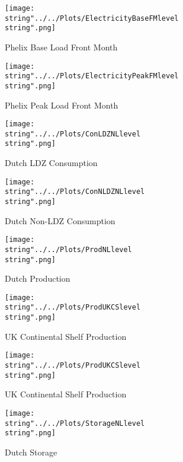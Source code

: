 \begin{figure}[ht]
  \centering
\texttt{[image: \\string"../../Plots/ElectricityBaseFMlevel\\string".png]}
  \caption{Phelix Base Load Front Month}\label{fig:ElectricityBaseFMlevel}
\end{figure}

\begin{figure}[ht]
  \centering
\texttt{[image: \\string"../../Plots/ElectricityPeakFMlevel\\string".png]}
  \caption{Phelix Peak Load Front Month}\label{fig:ElectricityPeakFMlevel}
\end{figure}

\begin{figure}[ht]
  \centering
\texttt{[image: \\string"../../Plots/ConLDZNLlevel\\string".png]}
  \caption{Dutch LDZ Consumption}\label{fig:ConLDZNLlevel}
\end{figure}

\begin{figure}[ht]
  \centering
\texttt{[image: \\string"../../Plots/ConNLDZNLlevel\\string".png]}
  \caption{Dutch Non-LDZ Consumption}\label{fig:ConNLDZNLlevel}
\end{figure}

\begin{figure}[ht]
  \centering
\texttt{[image: \\string"../../Plots/ProdNLlevel\\string".png]}
  \caption{Dutch Production}\label{fig:ProdNLlevel}
\end{figure}


\begin{figure}[ht]
  \centering
\texttt{[image: \\string"../../Plots/ProdUKCSlevel\\string".png]}
  \caption{UK Continental Shelf Production}\label{fig:ProdUKCSlevel}
\end{figure}


\begin{figure}[ht]
  \centering
\texttt{[image: \\string"../../Plots/ProdUKCSlevel\\string".png]}
  \caption{UK Continental Shelf Production}\label{fig:ProdUKCSlevel}
\end{figure}

\begin{figure}[ht]
  \centering
\texttt{[image: \\string"../../Plots/StorageNLlevel\\string".png]}
  \caption{Dutch Storage}\label{fig:StorageNLlevel}
\end{figure}


